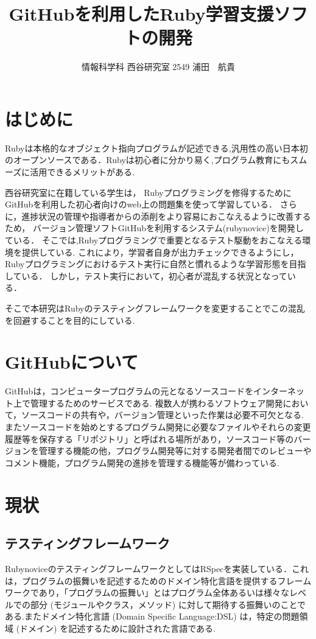 \documentclass[a4j,twocolumn,uplatex]{jsarticle}
\begin{document}
\title{GitHubを利用したRuby学習支援ソフトの開発}
\author{情報科学科 西谷研究室 2549 浦田　航貴}
\date{}
\maketitle
\section{はじめに}
Rubyは本格的なオブジェクト指向プログラムが記述できる,汎用性の高い日本初のオープンソースである．Rubyは初心者に分かり易く,プログラム教育にもスムーズに活用できるメリットがある.


西谷研究室に在籍している学生は，
Rubyプログラミングを修得するためにGitHubを利用した初心者向けのweb上の問題集を使って学習している．
さらに，進捗状況の管理や指導者からの添削をより容易におこなえるように改善するため，
バージョン管理ソフトGitHubを利用するシステム(rubynovice)を開発している．
そこでは,Rubyプログラミングで重要となるテスト駆動をおこなえる環境を提供している.
これにより，学習者自身が出力チェックできるようにし，
Rubyプログラミングにおけるテスト実行に自然と慣れるような学習形態を目指している．
しかし，テスト実行において，初心者が混乱する状況となっている．

そこで本研究はRubyのテスティングフレームワークを変更することでこの混乱を回避することを目的にしている\cite{1}.

\section{GitHubについて}
GitHubは，コンピュータープログラムの元となるソースコードをインターネット上で管理するためのサービスである.
複数人が携わるソフトウェア開発において，ソースコードの共有や，バージョン管理といった作業は必要不可欠となる.
またソースコードを始めとするプログラム開発に必要なファイルやそれらの変更履歴等を保存する「リポジトリ」と呼ばれる場所があり，ソースコード等のバージョンを管理する機能の他，プログラム開発等に対する開発者間でのレビューやコメント機能，プログラム開発の進捗を管理する機能等が備わっている\cite{2}.

\section{現状}
\subsection{テスティングフレームワーク}
RubynoviceのテスティングフレームワークとしてはRSpecを実装している．これは，プログラムの振舞いを記述するためのドメイン特化言語を提供するフレームワークであり，「プログラムの振舞い」とはプログラム全体あるいは様々なレベルでの部分 (モジュールやクラス，メソッド) に対して期待する振舞いのことである.またドメイン特化言語 (Domain Specific Language:DSL) は，特定の問題領域 (ドメイン) を記述するために設計された言語である\cite{3}.
\end{document}
